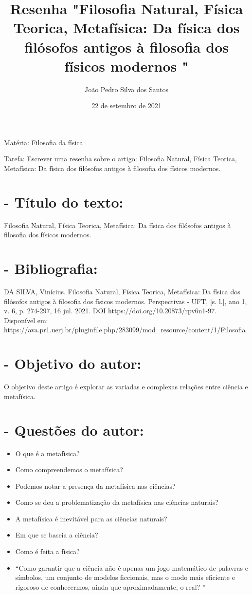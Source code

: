 \documentclass [a4paper, 12pt]{article}
\title{Resenha "Filosofia Natural, Física Teorica, Metafísica: Da física dos filósofos antigos à filosofia dos físicos modernos "}
\author{João Pedro Silva dos Santos}
\date{22 de setembro de 2021}
\begin{document}
\maketitle

Matéria: Filosofia da física

Tarefa: Escrever uma resenha sobre o artigo: Filosofia Natural, Física Teorica, Metafísica: Da física dos filósofos antigos à filosofia dos físicos modernos.

\section*{- Título do texto:}

Filosofia Natural, Física Teorica, Metafísica: Da física dos filósofos antigos à filosofia dos físicos modernos.

\section*{-  Bibliografia:}

DA SILVA, Vinícius. Filosofia Natural, Física Teorica, Metafísica: Da física dos filósofos antigos à filosofia dos físicos modernos. Perspectivas - UFT, [s. l.], ano 1, v. 6, p. 274-297, 16 jul. 2021. DOI https://doi.org/10.20873/rpv6n1-97. Disponível em: https://ava.pr1.uerj.br/pluginfile.php/283099/mod_resource/content/1/Filosofia%

\section*{- Objetivo do autor:}

O objetivo deste artigo é explorar as variadas e complexas relações entre ciência e metafísica.

\section*{- Questões do autor:}

\begin{itemize}
    \item O que é a metafísica?
    \item Como compreendemos o metafísica?
    \item Podemos notar a presença da metafísica nas ciências?
    \item Como se deu a problematização da metafísica nas ciências naturais?
    \item A metafísica é inevitável para as ciências naturais?
    \item Em que se baseia a ciência?
    \item Como é feita a física?
    \item “Como garantir que a ciência não é apenas um jogo matemático de palavras e símbolos, um conjunto de modelos ficcionais, mas o modo mais eficiente e rigoroso de conhecermos, ainda que aproximadamente, o real? ”
\end{itemize}
\end{document}
